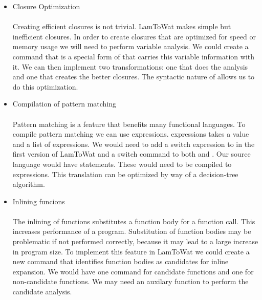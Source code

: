 \begin{itemize}
\item Closure Optimization\\\\
Creating efficient closures is not trivial. LamToWat makes simple but inefficient closures. In order to create closures that are optimized for speed or memory usage we will need to perform variable analysis. We could create a command that is a special form of  that carries this variable information with it. We can then implement two transformations: one that does the analysis and one that creates the better closures. The syntactic nature of  allows us to do this optimization.
\item Compilation of pattern matching\\\\
Pattern matching is a feature that benefits many functional languages. To compile pattern matching we can use  expressions.  expressions takes a value and a list of expressions. We would need to add a switch expression to  in the first version of LamToWat and a switch command to both  and . Our source language would have  statements. These would need to be compiled to  expressions. This translation can be optimized by way of a decision-tree algorithm.
\item Inlining funcions\\\\
The inlining of functions substitutes a function body for a function call. This increases performance of a program. Substitution of function bodies may be problematic if not performed correctly, because it may lead to a large increase in program size. To implement this feature in LamToWat we could create a new command that identifies function bodies as candidates for inline expansion. We would have one command for candidate functions and one for non-candidate functions. We may need an auxilary function to perform the candidate analysis.
\end{itemize}
